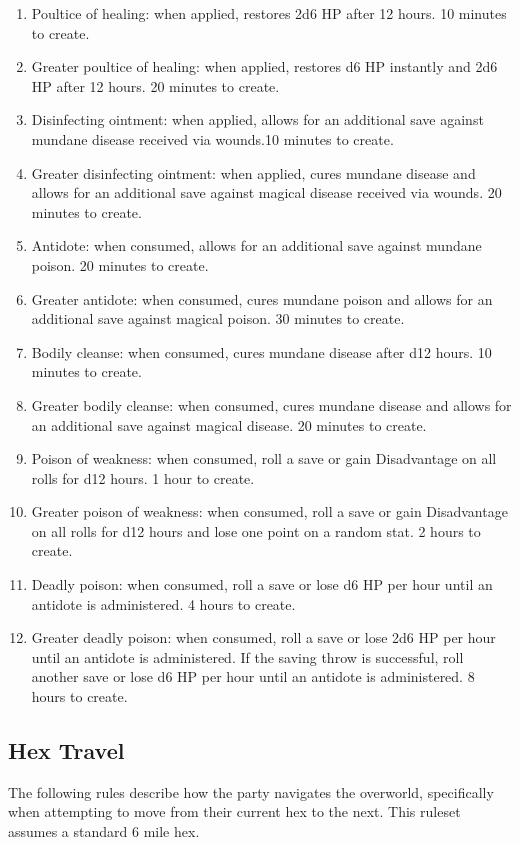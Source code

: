 \documentclass[twoside]{article}
\begin{document}
\begin{enumerate}[nosep]
\item Poultice of healing: when applied, restores 2d6 HP after 12 hours. 10 minutes to create.
\item Greater poultice of healing: when applied, restores d6 HP instantly and 2d6 HP after 12 hours. 20 minutes to create.
\item Disinfecting ointment: when applied, allows for an additional save against mundane disease received via wounds.10 minutes to create.
\item Greater disinfecting ointment: when applied, cures mundane disease and allows for an additional save against magical disease received via wounds. 20 minutes to create.
\item Antidote: when consumed, allows for an additional save against mundane poison. 20 minutes to create.
\item Greater antidote: when consumed, cures mundane poison and allows for an additional save against magical poison. 30 minutes to create.
\item Bodily cleanse: when consumed, cures mundane disease after d12 hours. 10 minutes to create.
\item Greater bodily cleanse: when consumed, cures mundane disease and allows for an additional save against magical disease. 20 minutes to create.
\item Poison of weakness: when consumed, roll a save or gain Disadvantage on all rolls for d12 hours. 1 hour to create.
\item Greater poison of weakness: when consumed, roll a save or gain Disadvantage on all rolls for d12 hours and lose one point on a random stat. 2 hours to create.
\item Deadly poison: when consumed, roll a save or lose d6 HP per hour until an antidote is administered. 4 hours to create.
\item Greater deadly poison: when consumed, roll a save or lose 2d6 HP per hour until an antidote is administered. If the saving throw is successful, roll another save or lose d6 HP per hour until an antidote is administered. 8 hours to create.
\end{enumerate}

\subsection*{Hex Travel}

The following rules describe how the party navigates the overworld, specifically when attempting to move from their current hex to the next. This ruleset assumes a standard 6 mile hex.
\end{document}
